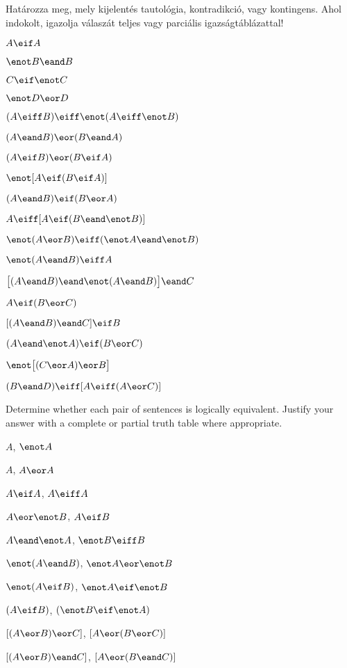 \solutions
\problempart
\label{pr.TT.TTorC}
Határozza meg, mely kijelentés tautológia, kontradikció, vagy kontingens. Ahol indokolt, igazolja válaszát teljes vagy parciális igazságtáblázattal!

\begin{earg}
\item $A \eif A$ %
\item $\enot B \eand B$ %
\item $C \eif\enot C$ %
\item $\enot D \eor D$ %
\item $(A \eiff B) \eiff \enot(A\eiff \enot B)$ %
\item $(A\eand B) \eor (B\eand A)$ %
\item $(A \eif B) \eor (B \eif A)$ %
\item $\enot[A \eif (B \eif A)]$ %
\item $(A \eand B) \eif (B \eor A)$  %
\item $A \eiff [A \eif (B \eand \enot B)]$ %
\item $\enot(A \eor B) \eiff (\enot A \eand \enot B)$ %
\item $\enot(A\eand B) \eiff A$ %
\item $\bigl[(A\eand B) \eand\enot(A\eand B)\bigr] \eand C$ %
\item $A\eif(B\eor C)$ %
\item $[(A \eand B) \eand C] \eif B$ %
\item $(A \eand\enot A) \eif (B \eor C)$ %
\item $\enot\bigl[(C\eor A) \eor B\bigr]$ %
\item $(B\eand D) \eiff [A \eiff(A \eor C)]$%
\end{earg}


\solutions
\problempart
\label{pr.TT.equiv}
Determine whether each pair of sentences is logically equivalent. Justify your answer with a complete or partial truth table where appropriate.
\begin{earg}
\item $A$, $\enot A$ %
\item $A$, $A \eor A$ %
\item $A\eif A$, $A \eiff A$ %
\item $A \eor \enot B$, $A\eif B$ %
\item $A \eand \enot A$, $\enot B \eiff B$ %
\item $\enot(A \eand B)$, $\enot A \eor \enot B$ %
\item $\enot(A \eif B)$, $\enot A \eif \enot B$ %
\item $(A \eif B)$, $(\enot B \eif \enot A)$ %
\item $[(A \eor B) \eor C]$, $[A \eor (B \eor C)]$ %
\item $[(A \eor B) \eand C]$, $[A \eor (B \eand C)]$ %
\end{earg}

